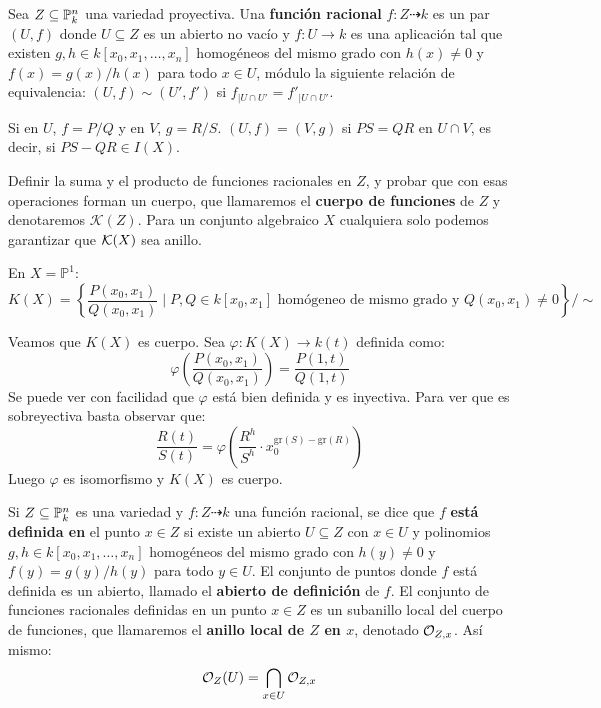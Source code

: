 \documentclass[ACGA.tex]{subfiles}
\begin{document}
\begin{defi}
 Sea $Z\subseteq\mathbb{P}^n_k$ una variedad proyectiva. Una {\bf función racional} $f:Z\dashrightarrow k$ es un par $(U,f)$ donde $U\subseteq Z$ es un abierto no vacío y $f:U\to k$ es una aplicación tal que existen $g,h\in k[x_0,x_1,\ldots,x_n]$ homogéneos del mismo grado con $h(x)\neq 0$ y $f(x)=g(x)/h(x)$ para todo $x\in U$, módulo la siguiente relación de equivalencia: $(U,f)\sim (U',f')$ si $f_{|U\cap U'}=f'_{|U\cap U'}$.
\end{defi}

\begin{nota}
Si en $U$, $f=P/Q$ y en $V$, $g=R/S$. $(U,f)=(V,g)$ si  $PS=QR$ en $U \cap V$, es decir, si $PS-QR\in I(X)$.
\end{nota}

\begin{ejer}
 Definir la suma y el producto de funciones racionales en $Z$, y probar que con esas operaciones forman un cuerpo, que llamaremos el {\bf cuerpo de funciones} de $Z$ y denotaremos ${\mathcal K}(Z)$. Para un conjunto algebraico $X$ cualquiera solo podemos garantizar que ${\mathcal K}(X)$ sea anillo.
\end{ejer}

\begin{ej}
En $X=\mathbb{P}^1$:
\[ K(X) = \left\{\frac{P(x_0,x_1)}{Q(x_0,x_1)} \mid P,Q \in k[x_0,x_1] \text{ homógeneo de mismo grado y }Q(x_0,x_1)\neq 0\right\} / \sim \]

Veamos que $K(X)$ es cuerpo. Sea $φ : K(X) \to k(t)$ definida como:
\[ φ\left(\frac{P(x_0,x_1)}{Q(x_0,x_1)}\right)  = \frac{P(1,t)}{Q(1,t)} \]
Se puede ver con facilidad que $φ$ está bien definida y es inyectiva. Para ver que es sobreyectiva basta observar que:
\[ \frac{R(t)}{S(t)} = φ \left(\frac{R^h}{S^h} \cdot x_0^{\text{gr}(S)-\text{gr}(R)} \right)\]
Luego $φ$ es isomorfismo y $K(X)$ es cuerpo.
\end{ej}

Si $Z\subseteq\mathbb{P}^n_k$ es una variedad y $f:Z\dashrightarrow k$ una función racional, se dice que $f$ {\bf está definida en} el punto $x\in Z$ si existe un abierto $U\subseteq Z$ con $x\in U$ y polinomios $g,h\in k[x_0,x_1,\ldots,x_n]$ homogéneos del mismo grado con $h(y)\neq 0$ y $f(y)=g(y)/h(y)$ para todo $y\in U$. El conjunto de puntos donde $f$ está definida es un abierto, llamado el {\bf abierto de definición} de $f$. El conjunto de funciones racionales definidas en un punto $x\in Z$ es un subanillo local del cuerpo de funciones, que llamaremos el {\bf anillo local de $Z$ en $x$}, denotado ${\mathcal O}_{Z,x}$.  Así mismo:
\[ {\mathcal O}_Z(U) = \bigcap_{x \in U} {\mathcal O}_{Z,x} \]
\end{document}
